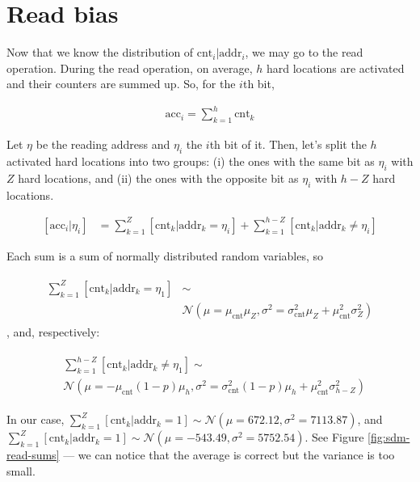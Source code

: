\section{Read bias}

Now that we know the distribution of $\text{cnt}_i | \text{addr}_i$, we may go to the read operation. During the read operation, on average, $h$ hard locations are activated and their counters are summed up. So, for the $i$th bit,

\begin{align}
\text{acc}_i = \sum_{k=1}^{h} \text{cnt}_k
\end{align}

Let $\eta$ be the reading address and $\eta_i$ the $i$th bit of it. Then, let's split the $h$ activated hard locations into two groups: (i) the ones with the same bit as $\eta_i$ with $Z$ hard locations, and (ii) the ones with the opposite bit as $\eta_i$ with $h-Z$ hard locations.

\begin{align}
\left[ \text{acc}_i|\eta_i \right] &= \sum_{k=1}^{Z} \left[ \text{cnt}_k | \text{addr}_k=\eta_i \right] + \sum_{k=1}^{h-Z} \left[ \text{cnt}_k | \text{addr}_k \ne \eta_i \right]
\end{align}

Each sum is a sum of normally distributed random variables, so

\begin{align}
\begin{split}
\sum_{k=1}^{Z} \left[ \text{cnt}_k | \text{addr}_k=\eta_1 \right] &\sim \\
& \mathcal{N}(\mu = \mu_\text{cnt} \mu_Z, \sigma^2 = \sigma_\text{cnt}^2 \mu_Z + \mu_\text{cnt}^2 \sigma^2_Z) \label{eqn:sdm-eta1-addr1}
\end{split}
\end{align}
, and, respectively:

\begin{align}
\begin{split}
& \sum_{k=1}^{h-Z} \left[ \text{cnt}_k | \text{addr}_k \ne \eta_1 \right] \sim \\
& \mathcal{N}(\mu = -\mu_\text{cnt} (1-p) \mu_h, \sigma^2 = \sigma^2_\text{cnt} (1-p) \mu_h + \mu_\text{cnt}^2 \sigma^2_{h-Z}) \label{eqn:sdm-eta1-addr0}
\end{split}
\end{align}

In our case, $\sum_{k=1}^{Z} \left[ \text{cnt}_k | \text{addr}_k=1 \right] \sim \mathcal{N}(\mu=672.12, \sigma^2=7113.87)$, and $\sum_{k=1}^{Z} \left[ \text{cnt}_k | \text{addr}_k=1 \right] \sim \mathcal{N}(\mu=-543.49, \sigma^2=5752.54)$. See Figure \ref{fig:sdm-read-sums} --- we can notice that the average is correct but the variance is too small.

